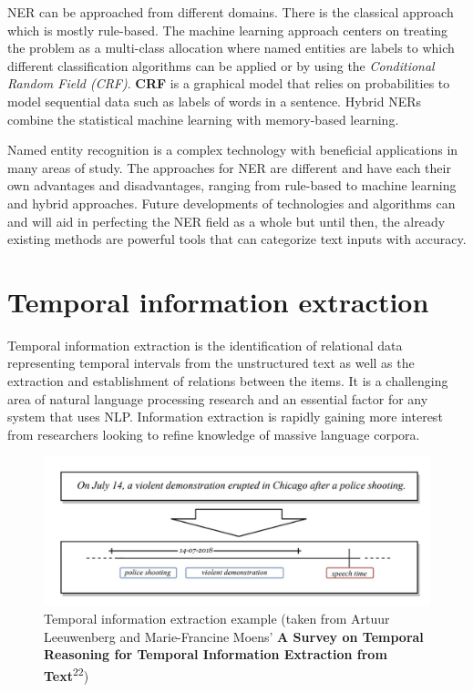 \documentclass{report}
\begin{document}
NER can be approached from different domains. There is the classical approach which is mostly rule-based. The machine learning approach centers on treating the problem as a multi-class allocation where named entities are labels to which different classification algorithms can be applied or by using the \textit{Conditional Random Field (CRF)}. \textbf{CRF} is a graphical model that relies on probabilities to model sequential data such as labels of words in a sentence.  Hybrid NERs combine the statistical machine learning with memory-based learning. \par

Named entity recognition is a complex technology with beneficial applications in many areas of study. The approaches for NER are different and have each their own advantages and disadvantages, ranging from rule-based to machine learning and hybrid approaches. Future developments of technologies and algorithms can and will aid in perfecting the NER field as a whole but until then, the already existing methods are powerful tools that can categorize text inputs with accuracy.

\section{Temporal information extraction}
Temporal information extraction is the identification of relational data representing temporal intervals from the unstructured text as well as the extraction and establishment of relations between the items. It is a challenging area of natural language processing research and an essential factor for any system that uses NLP. Information extraction is rapidly gaining more interest from researchers looking to refine knowledge of massive language corpora.\par

\begin{figure}[h]
\centering
\centerline{\includegraphics[width=1\textwidth]{tee}}
\caption{Temporal information extraction example (taken from Artuur Leeuwenberg and Marie-Francine Moens' \textbf{A Survey on Temporal Reasoning for Temporal Information Extraction from Text}\textsuperscript{22})}
\end{figure}
\end{document}
